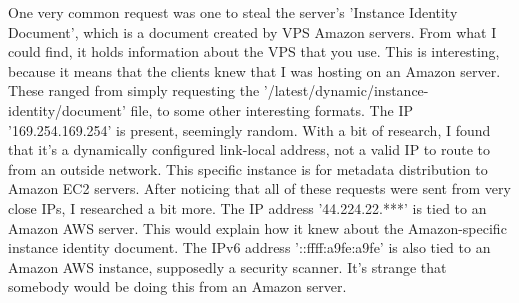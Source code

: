 \documentclass[12pt]{article}
\begin{document}
One very common request was one to steal the server's 'Instance Identity Document', which is a document created by VPS Amazon servers.
From what I could find, it holds information about the VPS that you use.
This is interesting, because it means that the clients knew that I was hosting on an Amazon server.
These ranged from simply requesting the '/latest/dynamic/instance-identity/document' file, to some other interesting formats.
The IP '169.254.169.254' is present, seemingly random.
With a bit of research, I found that it's a dynamically configured link-local address, not a valid IP to route to from an outside network.
This specific instance is for metadata distribution to Amazon EC2 servers.
After noticing that all of these requests were sent from very close IPs, I researched a bit more.
The IP address '44.224.22.***' is tied to an Amazon AWS server.
This would explain how it knew about the Amazon-specific instance identity document.
The IPv6 address '::ffff:a9fe:a9fe' is also tied to an Amazon AWS instance, supposedly a security scanner.
It's strange that somebody would be doing this from an Amazon server.

\clearpage
\tiny
\end{document}
